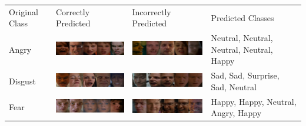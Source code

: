 \documentclass[10pt,twocolumn,letterpaper]{article}
\begin{document}
				\begin{table}[!ht]
		    \centering
		    \begin{tabular}{m{2cm}m{5cm}m{5cm}m{4cm}}
		    Original Class & Correctly Predicted & Incorrectly Predicted & Predicted Classes\\
		    Angry& \begin{minipage}{.3\textwidth}
		   \includegraphics[width=5cm]{res/0_best.pdf} 
		   \end{minipage}
		   & \begin{minipage}{.3\textwidth}
		   \includegraphics[width=5cm]{res/0_worst.pdf}
		    \end{minipage} & Neutral, Neutral, Neutral, Neutral, Happy\\
		    
		     Disgust& \begin{minipage}{.3\textwidth}
		   \includegraphics[width=5cm]{res/1_best.pdf} 
		   \end{minipage}
		   & \begin{minipage}{.3\textwidth}
		   \includegraphics[width=5cm]{res/1_worst.pdf}
		    \end{minipage} & Sad, Sad, Surprise, Sad, Neutral\\
		    
		     Fear& \begin{minipage}{.3\textwidth}
		   \includegraphics[width=5cm]{res/2_best.pdf} 
		   \end{minipage}
		   & \begin{minipage}{.3\textwidth}
		   \includegraphics[width=5cm]{res/2_worst.pdf}
		    \end{minipage} & Happy, Happy, Neutral, Angry, Happy\\
		     

\end{tabular}
\end{table}
\end{document}

